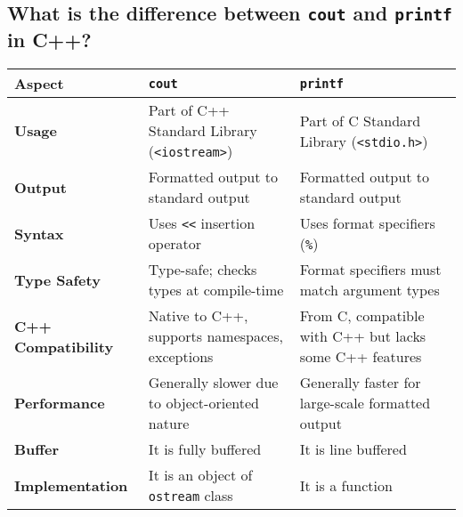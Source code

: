 \subsection{What is the difference between \texttt{cout} and \texttt{printf} in C++?}
\begin{tabularx}{\textwidth}{|p{3.5cm}|X|X|}
    \hline \rowcolor{tableheader}
    \textbf{Aspect}          & \texttt{cout}                                  & \texttt{printf}                               \\
    \hline
    \textbf{Usage}           & Part of C++ Standard Library (\texttt{<iostream>}) & Part of C Standard Library (\texttt{<stdio.h>}) \\
    \hline
    \textbf{Output}          & Formatted output to standard output            & Formatted output to standard output           \\
    \hline
    \textbf{Syntax}          & Uses \texttt{<<} insertion operator           & Uses format specifiers (\texttt{\%})          \\
    \hline
    \textbf{Type Safety}     & Type-safe; checks types at compile-time       & Format specifiers must match argument types  \\
    \hline
    \textbf{C++ Compatibility} & Native to C++, supports namespaces, exceptions & From C, compatible with C++ but lacks some C++ features \\
    \hline
    \textbf{Performance}     & Generally slower due to object-oriented nature & Generally faster for large-scale formatted output \\
    \hline
    \textbf{Buffer}          & It is fully buffered                           & It is line buffered \\
    \hline
    \textbf{Implementation}  & It is an object of \texttt{ostream} class      & It is a function \\
    \hline
\end{tabularx}

